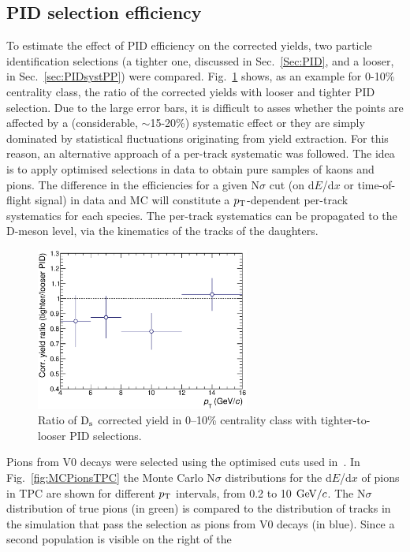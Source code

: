 \subsection{PID selection efficiency}
\label{sec:PIDsystAA}
To estimate the effect of PID efficiency on the corrected yields, 
two particle identification selections (a tighter one, discussed in Sec.~\ref{Sec:PID}, and a 
looser, in Sec.~\ref{sec:PIDsystPP}) were compared. Fig.~\ref{fig:DsPID010} 
shows, as an example for 0-10\% centrality class, the ratio of the corrected yields 
with looser and tighter PID selection. Due to the large error bars, it is difficult to asses
whether the points are affected by a (considerable, $\sim$15-20\%) systematic effect
or they are simply dominated by statistical fluctuations originating from
yield extraction. For this reason, an alternative approach of a per-track 
systematic was followed. The idea is to apply optimised selections in data to obtain
pure samples of kaons and pions. The difference in the efficiencies for a given N$\sigma$ cut (on d$E$/d$x$ or 
time-of-flight signal) in data and MC will
constitute a $p_{\rm T}$-dependent per-track systematics for each species.
The per-track systematics can be propagated to the D-meson level, via the kinematics of
the tracks of the daughters.
\begin{figure}[!h]
 \centering
 \includegraphics[angle=0, width=7cm]{./FigCap5/PIDsyst_010.eps}
 \caption{Ratio of ${\rm D_s}$ corrected yield in 0--10\% centrality class with tighter-to-looser PID selections.}
 \label{fig:DsPID010} 
\end{figure}
Pions from V0 decays were selected using the optimised cuts
used in~\cite{Schuchmann:2102194}. In Fig.~\ref{fig:MCPionsTPC} the Monte Carlo 
N$\sigma$ distributions for the d$E$/d$x$ of pions in TPC are shown for 
different $p_{\rm T}$ intervals, from 0.2 to 10 $\mathrm{GeV}/c$.
The N$\sigma$ distribution of true pions (in green) is compared to the
distribution of tracks in the simulation that pass the selection as pions from V0 decays 
(in blue). Since a second population is visible on the right of the 
